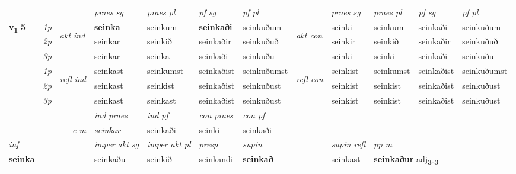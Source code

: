 \begin{longtable}[l]{X>{\footnotesize\itshape}llXXXXlXXXX}
\midrule

 & &   & \textit{praes sg}  & \textit{praes pl}    & \textit{ pf sg} & \textit{pf pl} & & \textit{praes sg}  & \textit{praes pl}    & \textit{pf sg} & \textit{pf pl }  \\ \cmidrule{4-7} \cmidrule{9-12}
 \multirow{2}{*}{{{\textbf{v{\textsubscript{1}}} \Large{\textbf{5}}}}}  & 1p & \multirow{3}{*}{\begin{turn}{90}\textit{akt ind}\end{turn}} & \textbf{seinka} & seinkum & \textbf{seinkaði} & seinkuðum & \multirow{3}{*}{\begin{turn}{90}\textit{akt con}\end{turn}} &seinki & seinkum & seinkaði & seinkuðum\\*
 & 2p &  &  seinkar  & seinkið & seinkaðir & seinkuðuð & & seinkir & seinkið & seinkaðir & seinkuðuð \\*
 & 3p &  & seinkar & seinka & seinkaði & seinkuðu & & seinki & seinki& seinkaði & seinkuðu \\*
\cmidrule{4-7} \cmidrule{9-12}
 & 1p & \multirow{3}{*}{\begin{turn}{90}\textit{refl ind}\end{turn}}  & seinkast & seinkumst & seinkaðist & seinkuðumst & \multirow{3}{*}{\begin{turn}{90}\textit{refl con}\end{turn}}  &seinkist & seinkumst & seinkaðist & seinkuðumst \\*
 & 2p &  & seinkast & seinkist & seinkaðist & seinkuðust & &seinkist & seinkist & seinkaðist & seinkuðust \\*
 & 3p  & & seinkast & seinkast & seinkaðist & seinkuðust & & seinkist & seinkist& seinkaðist & seinkuðust \\*
\cmidrule{4-7} \cmidrule{9-12}

   && &  \textit{ind praes} & \textit{ind pf} & \textit{con praes} & \textit{con pf} \\*
\multicolumn{3}{r}{\textit{e-m}} & seinkar & seinkaði & seinki & seinkaði \\*

\cmidrule{4-7}
   {\textit{inf}} & &  & \textit{imper akt sg} & \textit{imper akt pl}   & \textit{presp} & \textit{supin} && \textit{supin refl} & \textit{pp m} \\*
  {\textbf{seinka}} & && seinkaðu  & seinkið   & seinkandi &  \textbf{seinkað} && seinkast & \multicolumn{2}{l}{\textbf{seinkaður} adj\textbf{\textsubscript{3-3}}} \\*


\end{longtable}

